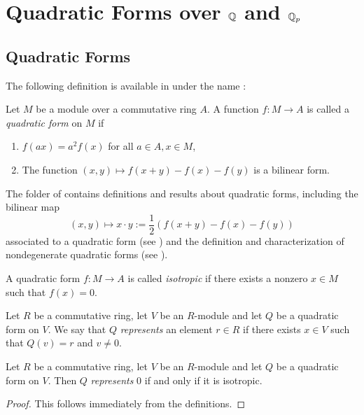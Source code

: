 \chapter[Quadratic Forms over the Rationals and the p-adics]{Quadratic Forms over $\mathbb{Q}$ and $\mathbb{Q}_p$}

\section{Quadratic Forms}\label{sec:quadratic_form}

The following definition is available in \mathlib under the name :
\begin{definition}\label{def:quadratic_form}
\mathlibok
Let $M$ be a module over a commutative ring $A$. A function $f : M \to A$ is called a \emph{quadratic form} on $M$ if
\begin{enumerate}
\item $f(ax) = a^2f(x)$ for all $a \in A, x \in M$,
\item The function $(x, y) \mapsto f(x + y) - f(x) - f(y)$ is a bilinear form.
\end{enumerate}
\end{definition}

The  folder of \mathlib contains definitions and results about quadratic forms, including the bilinear map
\[ (x, y) \mapsto x \cdot y := \frac{1}{2}(f(x + y) - f(x) - f(y))\] associated to a quadratic form (see ) and the definition and characterization of nondegenerate quadratic forms (see ).

\begin{definition}\label{def:isotropic}
\leanok
A quadratic form $f : M \to A$ is called \emph{isotropic} if there exists a nonzero $x \in M$ such that $f(x) = 0$.
\end{definition}

\begin{definition}\label{def:represents}
	\leanok
	Let $R$ be a commutative ring, let $V$ be an $R$-module and let $Q$ be a quadratic form on $V$. We say that $Q$ \emph{represents} an element $r \in R$ if there exists $x \in V$ such that $Q(v) = r$ and $v \ne 0$.
\end{definition}

\begin{lemma}\label{lem:represents_zero}
	\leanok
	Let $R$ be a commutative ring, let $V$ be an $R$-module and let $Q$ be a quadratic form on $V$. Then $Q$ \emph{represents} $0$ if and only if it is isotropic.
\end{lemma}
\begin{proof}
	\leanok
	This follows immediately from the definitions.
\end{proof}


